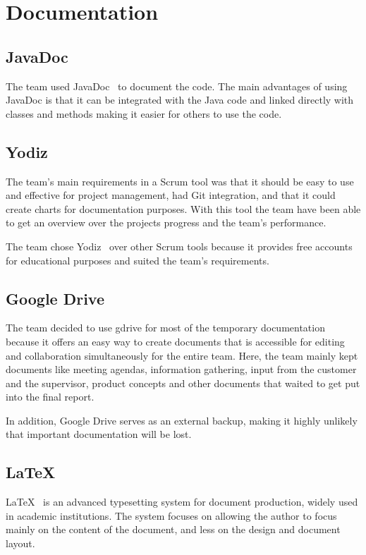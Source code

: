 \section{Documentation}

\subsection{JavaDoc}
The team used JavaDoc~\cite{javadoc} to document the code. The main advantages of using JavaDoc is that it can be integrated with the Java code and linked directly with classes and methods making it easier for others to use the code.

\subsection{Yodiz}
The team's main requirements in a Scrum tool was that it should be easy to use and effective for project management, had Git integration, and that it could create charts for documentation purposes. With this tool the team have been able to get an overview over the projects progress and the team's performance. 

The team chose Yodiz~\cite{yodiz} over other Scrum tools because it provides free accounts for educational purposes and suited the team's requirements. 

\subsection{Google Drive}
The team decided to use \gls{gdrive} for most of the temporary documentation because it offers an easy way to create documents that is accessible for editing and collaboration simultaneously for the entire team. Here, the team mainly kept documents like meeting agendas, information gathering, input from the customer and the supervisor, product concepts and other documents that waited to get put into the final report. 

In addition, Google Drive serves as an external backup, making it highly unlikely that important documentation will be lost. 


\subsection{\LaTeX}
LaTeX~\cite{latex} is an advanced typesetting system for document production, widely used in
academic institutions. The system focuses on allowing the author to focus mainly on the content of the document, and less on the design and document layout.

